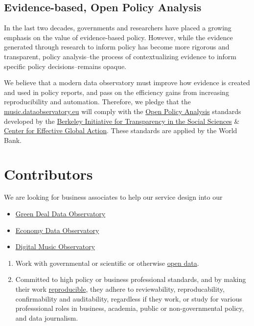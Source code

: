 \documentclass[
  a4paper,
  openany, a4paper, oneside]{book}
\begin{document}
\hypertarget{opa}{%
\subsection{Evidence-based, Open Policy Analysis}\label{opa}}

In the last two decades, governments and researchers have placed a growing emphasis on the value of evidence-based policy. However, while the evidence generated through research to inform policy has become more rigorous and transparent, policy analysis--the process of contextualizing evidence to inform specific policy decisions--remains opaque.

We believe that a modern data observatory must improve how evidence is created and used in policy reports, and pass on the efficiency gains from increasing reproducibility and automation. Therefore, we pledge that the \href{https://music.dataobservatory.eu}{music.dataobservatory.eu} will comply with the \href{https://www.bitss.org/opa/}{Open Policy Analysis} standards developed by the \href{https://www.bitss.org/}{Berkeley Initiative for Transparency in the Social Sciences} \& \href{https://cega.berkeley.edu/}{Center for Effective Global Action}. These standards are applied by the World Bank.

\hypertarget{contributors}{%
\section{Contributors}\label{contributors}}

We are looking for business associates to help our service design into our

\begin{itemize}
\item
  \href{https://greendeal.dataobservatory.eu/\#contributors}{Green Deal Data Observatory}
\item
  \href{https://economy.dataobservatory.eu/\#contributors}{Economy Data Observatory}
\item
  \href{https://music.dataobservatory.eu/\#contributors}{Digital Music Observatory}
\end{itemize}

\begin{enumerate}
\def\labelenumi{\arabic{enumi}.}
\item
  Work with governmental or scientific or otherwise \protect\hyperlink{open-data}{open data}.
\item
  Committed to high policy or business professional standards, and by making their work \protect\hyperlink{reproducible-research}{reproducible}, they adhere to reviewability, reproducability, confirmability and auditability, regardless if they work, or study for various professsional roles in business, academia, public or non-governmental policy, and data journalism.
\end{enumerate}
\end{document}
